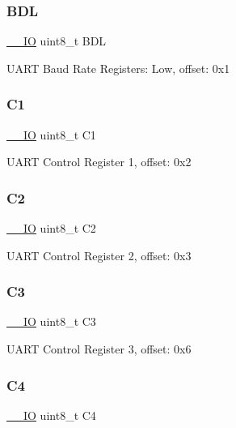 \subsubsection{\texorpdfstring{BDL}{BDL}}
{\footnotesize\ttfamily \mbox{\hyperlink{core__cm0plus_8h_aec43007d9998a0a0e01faede4133d6be}{\+\_\+\+\_\+\+IO}} uint8\+\_\+t B\+DL}

U\+A\+RT Baud Rate Registers\+: Low, offset\+: 0x1 \mbox{\label{struct_u_a_r_t___type_ad54aa92be9fc988e74d55d2d3daae8ad}} 
\subsubsection{\texorpdfstring{C1}{C1}}
{\footnotesize\ttfamily \mbox{\hyperlink{core__cm0plus_8h_aec43007d9998a0a0e01faede4133d6be}{\+\_\+\+\_\+\+IO}} uint8\+\_\+t C1}

U\+A\+RT Control Register 1, offset\+: 0x2 \mbox{\label{struct_u_a_r_t___type_a4f920936a8fc32483b3ebd9b0674b450}} 
\subsubsection{\texorpdfstring{C2}{C2}}
{\footnotesize\ttfamily \mbox{\hyperlink{core__cm0plus_8h_aec43007d9998a0a0e01faede4133d6be}{\+\_\+\+\_\+\+IO}} uint8\+\_\+t C2}

U\+A\+RT Control Register 2, offset\+: 0x3 \mbox{\label{struct_u_a_r_t___type_a6533a725e5ee4892879f0b6d9dd6675a}} 
\subsubsection{\texorpdfstring{C3}{C3}}
{\footnotesize\ttfamily \mbox{\hyperlink{core__cm0plus_8h_aec43007d9998a0a0e01faede4133d6be}{\+\_\+\+\_\+\+IO}} uint8\+\_\+t C3}

U\+A\+RT Control Register 3, offset\+: 0x6 \mbox{\label{struct_u_a_r_t___type_adb3f29cb83f573e65eb091a7a79e2e43}} 
\subsubsection{\texorpdfstring{C4}{C4}}
{\footnotesize\ttfamily \mbox{\hyperlink{core__cm0plus_8h_aec43007d9998a0a0e01faede4133d6be}{\+\_\+\+\_\+\+IO}} uint8\+\_\+t C4}

